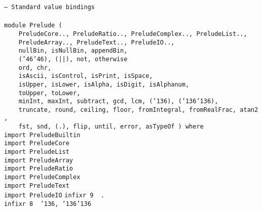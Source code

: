 \noindent\bprogB
\mbox{\tt --\ Standard\ value\ bindings}\\
\mbox{\tt }\\[-8pt]
\mbox{\tt module\ Prelude\ (}\\
\mbox{\tt \ \ \ \ PreludeCore..,\ PreludeRatio..,\ PreludeComplex..,\ PreludeList..,}\\
\mbox{\tt \ \ \ \ PreludeArray..,\ PreludeText..,\ PreludeIO..,\ }\\
\mbox{\tt \ \ \ \ nullBin,\ isNullBin,\ appendBin,}\\
\mbox{\tt \ \ \ \ ({\char'46}{\char'46}),\ (||),\ not,\ otherwise}\\
\mbox{\tt \ \ \ \ ord,\ chr,\ }\\
\mbox{\tt \ \ \ \ isAscii,\ isControl,\ isPrint,\ isSpace,\ }\\
\mbox{\tt \ \ \ \ isUpper,\ isLower,\ isAlpha,\ isDigit,\ isAlphanum,}\\
\mbox{\tt \ \ \ \ toUpper,\ toLower,}\\
\mbox{\tt \ \ \ \ minInt,\ maxInt,\ subtract,\ gcd,\ lcm,\ ({\char'136}),\ ({\char'136}{\char'136}),\ }\\
\mbox{\tt \ \ \ \ truncate,\ round,\ ceiling,\ floor,\ fromIntegral,\ fromRealFrac,\ atan2,}\\
\mbox{\tt \ \ \ \ fst,\ snd,\ (.),\ flip,\ until,\ error,\ asTypeOf\ )\ where}
%
\eprogB\noindent\bprogB
\mbox{\tt import\ PreludeBuiltin}\\
\mbox{\tt import\ PreludeCore}\\
\mbox{\tt import\ PreludeList}\\
\mbox{\tt import\ PreludeArray}\\
\mbox{\tt import\ PreludeRatio}\\
\mbox{\tt import\ PreludeComplex}\\
\mbox{\tt import\ PreludeText}\\
\mbox{\tt import\ PreludeIO}
%
%
%
%
%
%
%
%
\eprogB\noindent\bprogB
\mbox{\tt infixr\ 9\ \ .}\\
\mbox{\tt infixr\ 8\ \ {\char'136},\ {\char'136}{\char'136}}\\
